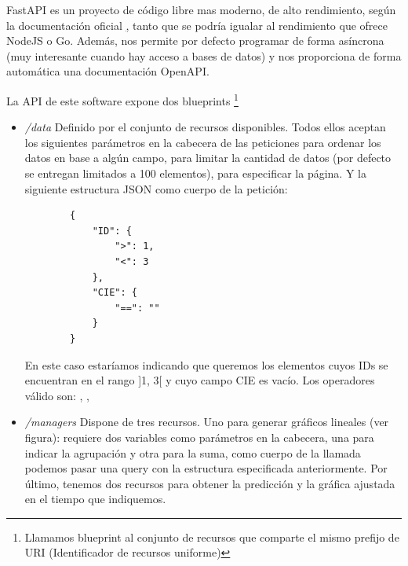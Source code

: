 FastAPI es un proyecto de código libre mas moderno, de alto rendimiento, según la documentación oficial \href{https://fastapi.tiangolo.com}, tanto que se podría igualar al rendimiento que ofrece NodeJS o Go. Además, nos permite por defecto programar de forma asíncrona (muy interesante cuando hay acceso a bases de datos) y nos proporciona de forma automática una documentación OpenAPI.

La API de este software expone dos blueprints \footnote{Llamamos blueprint al conjunto de recursos que comparte el mismo prefijo de URI (Identificador de recursos uniforme)}

\begin{itemize}
    \item \textit{/data} Definido por el conjunto de recursos disponibles. Todos ellos aceptan los siguientes parámetros en la cabecera de las peticiones  para ordenar los datos en base a algún campo,  para limitar la cantidad de datos (por defecto se entregan limitados a 100 elementos),  para especificar la página.
    Y la siguiente estructura JSON como cuerpo de la petición:
    \begin{verbatim}
        {
            "ID": {
                ">": 1,
                "<": 3
            },
            "CIE": {
                "==": ""
            }
        }
    \end{verbatim}
    En este caso estaríamos indicando que queremos los elementos cuyos IDs se encuentran en el rango ]1, 3[ y cuyo campo CIE es vacío. Los operadores válido son: \codeword{==}, \codeword{<}, \codeword{>}

    \item \textit{/managers} Dispone de tres recursos. Uno para generar gráficos lineales (ver figura): requiere dos variables como parámetros en la cabecera, una para indicar la agrupación y otra para la suma, como cuerpo de la llamada podemos pasar una query con la estructura especificada anteriormente. Por último, tenemos dos recursos para obtener la predicción y la gráfica ajustada en el tiempo que indiquemos.
\end{itemize}

